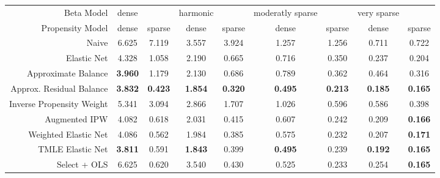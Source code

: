 \begin{table}[ht]
\centering
\begin{tabular}{|r|cc|cc|cc|cc|}
   \hline
Beta Model & dense &  & harmonic &  & moderatly sparse &  & very sparse &  \\ 
  Propensity Model & dense & sparse & dense & sparse & dense & sparse & dense & sparse \\ 
   \hline
Naive & 6.625 & 7.119 & 3.557 & 3.924 & 1.257 & 1.256 & 0.711 & 0.722 \\ 
  Elastic Net & 4.328 & 1.058 & 2.190 & 0.665 & 0.716 & 0.350 & 0.237 & 0.204 \\ 
   \hline
Approximate Balance &  \bf 3.960 & 1.179 & 2.130 & 0.686 & 0.789 & 0.362 & 0.464 & 0.316 \\ 
  Approx. Residual Balance &  \bf 3.832 &  \bf 0.423 &  \bf 1.854 &  \bf 0.320 &  \bf 0.495 &  \bf 0.213 &  \bf 0.185 &  \bf 0.165 \\ 
   \hline
Inverse Propensity Weight & 5.341 & 3.094 & 2.866 & 1.707 & 1.026 & 0.596 & 0.586 & 0.398 \\ 
  Augmented IPW & 4.082 & 0.618 & 2.031 & 0.415 & 0.607 & 0.242 & 0.209 &  \bf 0.166 \\ 
   \hline
Weighted Elastic Net & 4.086 & 0.562 & 1.984 & 0.385 & 0.575 & 0.232 & 0.207 &  \bf 0.171 \\ 
  TMLE Elastic Net &  \bf 3.811 & 0.591 &  \bf 1.843 & 0.399 &  \bf 0.495 & 0.239 &  \bf 0.192 &  \bf 0.165 \\ 
   \hline
Select + OLS & 6.625 & 0.620 & 3.540 & 0.430 & 0.525 & 0.233 & 0.254 &  \bf 0.165 \\ 
   \hline
\end{tabular}
\end{table}
